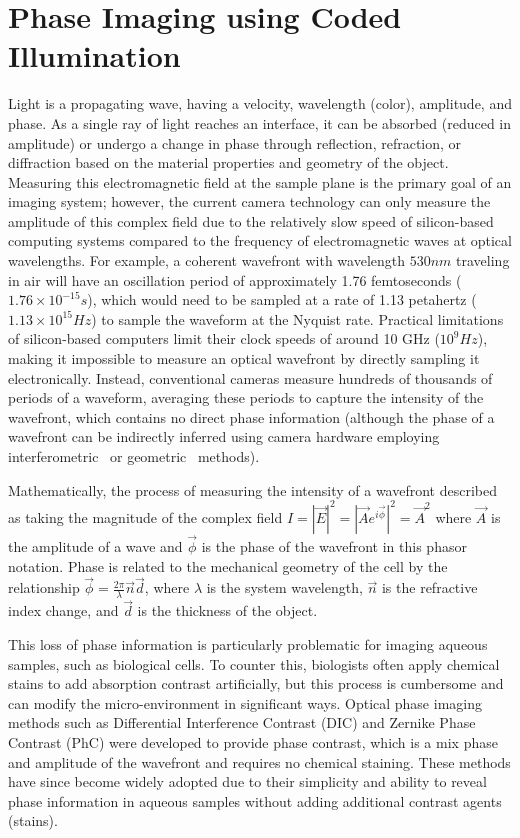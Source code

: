 \chapter{Phase Imaging using Coded Illumination}\label{ch:phase}

Light is a propagating wave, having a velocity, wavelength (color), amplitude, and phase. As a single ray of light reaches an interface, it can be absorbed (reduced in amplitude) or undergo a change in phase through reflection, refraction, or diffraction based on the material properties and geometry of the object. Measuring this electromagnetic field at the sample plane is the primary goal of an imaging system; however, the current camera technology can only measure the amplitude of this complex field due to the relatively slow speed of silicon-based computing systems compared to the frequency of electromagnetic waves at optical wavelengths. For example, a coherent wavefront with wavelength $530nm$ traveling in air will have an oscillation period of approximately 1.76 femtoseconds ($1.76 \times 10^{-15} s$), which would need to be sampled at a rate of 1.13 petahertz ($1.13 \times 10^{15} Hz$) to sample the waveform at the Nyquist rate. Practical limitations of silicon-based computers limit their clock speeds of around 10 GHz ($10^9 Hz$), making it impossible to measure an optical wavefront by directly sampling it electronically. Instead, conventional cameras measure hundreds of thousands of periods of a waveform, averaging these periods to capture the intensity of the wavefront, which contains no direct phase information (although the phase of a wavefront can be indirectly inferred using camera hardware employing interferometric~\cite{phasics, platt2001history} or geometric~\cite{Ng2005} methods).

Mathematically, the process of measuring the intensity of a wavefront described as taking the magnitude of the complex field $I =|\vec{E}|^2 =|\vec{A}e^{i\vec{\phi}}|^2 = \vec{A}^2$ where $\vec{A}$ is the amplitude of a wave and $\vec{\phi}$ is the phase of the wavefront in this phasor notation. Phase is related to the mechanical geometry of the cell by the relationship $\vec{\phi} = \frac{2\pi}{\lambda} \vec{n} \vec{d}$, where $\lambda$ is the system wavelength, $\vec{n}$ is the refractive index change, and $\vec{d}$ is the thickness of the object.

This loss of phase information is particularly problematic for imaging aqueous samples, such as biological cells. To counter this, biologists often apply chemical stains to add absorption contrast artificially, but this process is cumbersome and can modify the micro-environment in significant ways. Optical phase imaging methods such as Differential Interference Contrast (DIC)\cite{smithDIC} and Zernike Phase Contrast (PhC) \cite{zernike1955discovered} were developed to provide phase contrast, which is a mix phase and amplitude of the wavefront and requires no chemical staining. These methods have since become widely adopted due to their simplicity and ability to reveal phase information in aqueous samples without adding additional contrast agents (stains).

